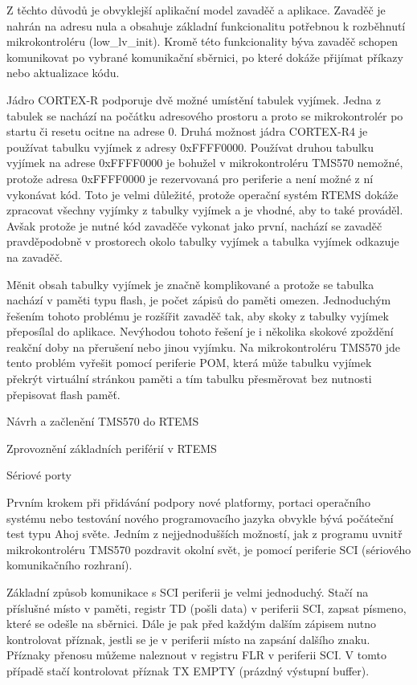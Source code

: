 	Z těchto důvodů je obvyklejší aplikační model zavaděč a aplikace.
Zavaděč je nahrán na adresu nula a obsahuje základní funkcionalitu potřebnou k rozběhnutí mikrokontroléru (low\_lv\_init).
Kromě této funkcionality býva zavaděč schopen komunikovat po vybrané komunikační sběrnici, po které dokáže přijímat příkazy nebo aktualizace kódu.
	
	Jádro CORTEX-R podporuje dvě možné umístění tabulek vyjímek.
Jedna z tabulek se nachází na počátku adresového prostoru a proto se mikrokontrolér po startu či resetu ocitne na adrese 0.
Druhá možnost jádra CORTEX-R4 je používat tabulku vyjímek z adresy 0xFFFF0000.
Používat druhou tabulku vyjímek na adrese 0xFFFF0000 je bohužel v mikrokontroléru TMS570 nemožné, protože adresa 0xFFFF0000 je rezervovaná pro periferie a není možné z ní vykonávat kód.
Toto je velmi důležité, protože operační systém RTEMS dokáže zpracovat všechny vyjímky z tabulky vyjímek a je vhodné, aby to také prováděl.
Avšak protože je nutné kód zavaděče vykonat jako první, nachází se zavaděč pravděpodobně v prostorech okolo tabulky vyjímek a tabulka vyjímek odkazuje na zavaděč.

	Měnit obsah tabulky vyjímek je značně komplikované a protože se tabulka nachází v paměti typu flash, je počet zápisů do paměti omezen.
Jednoduchým řešením tohoto problému je rozšířit zavaděč tak, aby skoky z tabulky vyjímek přeposílal do aplikace.
Nevýhodou tohoto řešení je i několika skokové zpoždění reakční doby na přerušení nebo jinou vyjímku.
Na mikrokontroléru TMS570 jde tento problém vyřešit pomocí periferie POM, která může tabulku vyjímek překrýt virtuální stránkou paměti a tím tabulku přesměrovat bez nutnosti přepisovat flash paměť. 
	 

\sec Návrh a začlenění TMS570 do RTEMS


\sec Zprovoznění základních periférií v RTEMS

\secc        Sériové porty

Prvním krokem při přidávání podpory nové platformy, portaci operačního systému nebo testování nového programovacího jazyka obvykle bývá počáteční test typu Ahoj světe.
Jedním z nejjednodušších možností, jak z programu uvnitř mikrokontroléru TMS570 pozdravit okolní svět, je pomocí periferie SCI (sériového komunikačního rozhraní).

Základní způsob komunikace s SCI periferii je velmi jednoduchý.
Stačí na příslušné místo v paměti, registr TD (pošli data) v periferii SCI, zapsat písmeno, které se odešle na sběrnici.
Dále je pak před každým dalším zápisem nutno kontrolovat příznak, jestli se je v periferii místo na zapsání dalšího znaku.
Příznaky přenosu můžeme naleznout v registru FLR v periferii SCI.
V tomto případě stačí kontrolovat příznak TX EMPTY (prázdný výstupní buffer).

